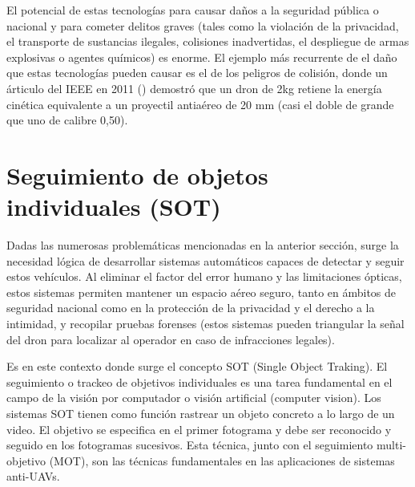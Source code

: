     El potencial de estas tecnologías para causar daños a la seguridad pública o nacional y para cometer delitos graves (tales como la violación de la privacidad, el transporte de sustancias ilegales, colisiones inadvertidas, el despliegue de armas explosivas o agentes químicos) es enorme. El ejemplo más recurrente de el daño que estas tecnologías pueden causar es el de los peligros de colisión, donde un árticulo del IEEE en 2011 (\cite{estudio_peso_drones}) demostró que un dron de 2kg retiene la energía cinética equivalente a un proyectil antiaéreo de 20 mm (casi el doble de grande que uno de calibre 0,50).


    \section{Seguimiento de objetos individuales (SOT)}

    Dadas las numerosas problemáticas mencionadas en la anterior sección, surge la necesidad lógica de desarrollar sistemas automáticos capaces de detectar y seguir estos vehículos. Al eliminar el factor del error humano y las limitaciones ópticas, estos sistemas permiten mantener un espacio aéreo seguro, tanto en ámbitos de seguridad nacional como en la protección de la privacidad y el derecho a la intimidad, y recopilar pruebas forenses (estos sistemas pueden triangular la señal del dron para localizar al operador en caso de infracciones legales).

    Es en este contexto donde surge el concepto SOT (Single Object Traking). El seguimiento o trackeo de objetivos individuales es una tarea fundamental en el campo de la visión por computador o visión artificial (computer vision). Los sistemas SOT tienen como función rastrear un objeto concreto a lo largo de un video. El objetivo se especifica en el primer fotograma y debe ser reconocido y seguido en los fotogramas sucesivos. Esta técnica, junto con el seguimiento multi-objetivo (MOT), son las técnicas fundamentales en las aplicaciones de sistemas anti-UAVs.

